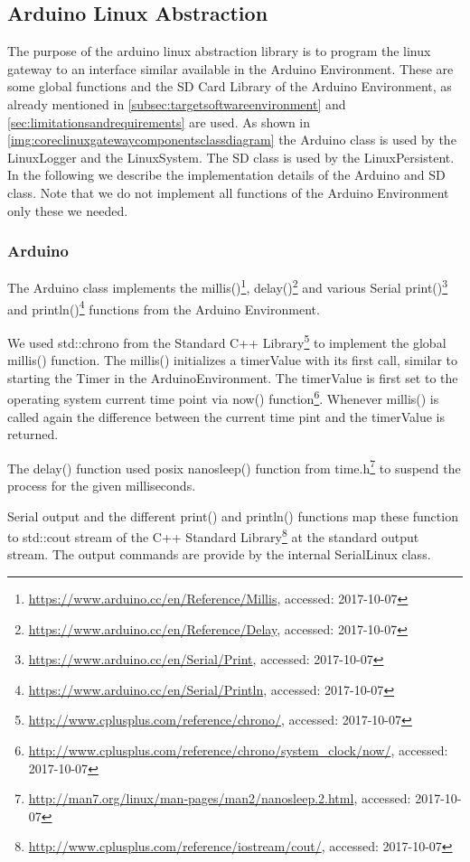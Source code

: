 \subsection{Arduino Linux Abstraction}\label{sec:arduinolinuxabstraction}
The purpose of the arduino linux abstraction library is to program the linux gateway to an interface similar available in the Arduino Environment.
These are some global functions and the SD Card Library of the Arduino Environment, as already mentioned in \autoref{subsec:targetsoftwareenvironment} and \autoref{sec:limitationsandrequirements} are used.
As shown in \autoref{img:coreclinuxgatewaycomponentsclassdiagram} the Arduino class is used by the LinuxLogger and the LinuxSystem.
The SD class is used by the LinuxPersistent.
In the following we describe the implementation details of the Arduino and SD class.
Note that we do not implement all functions of the Arduino Environment only these we needed.
\subsubsection{Arduino}
The Arduino class implements the millis()\footnote{\url{https://www.arduino.cc/en/Reference/Millis}, accessed: 2017-10-07}, delay()\footnote{\url{https://www.arduino.cc/en/Reference/Delay}, accessed: 2017-10-07} and various Serial print()\footnote{\url{https://www.arduino.cc/en/Serial/Print}, accessed: 2017-10-07} and println()\footnote{\url{https://www.arduino.cc/en/Serial/Println}, accessed: 2017-10-07} functions from the Arduino Environment.

We used std::chrono from the Standard C++ Library\footnote{\url{http://www.cplusplus.com/reference/chrono/}, accessed: 2017-10-07} to implement the global millis() function.
The millis() initializes a timerValue with its first call, similar to starting the Timer in the ArduinoEnvironment.
The timerValue is first set to the operating system current time point via now() function\footnote{\url{http://www.cplusplus.com/reference/chrono/system_clock/now/}, accessed: 2017-10-07}.
Whenever millis() is called again the difference between the current time pint and the timerValue is returned.

The delay() function used posix nanosleep() function from time.h\footnote{\url{http://man7.org/linux/man-pages/man2/nanosleep.2.html}, accessed: 2017-10-07} to suspend the process for the given milliseconds.

Serial output and the different print() and println() functions map these function to std::cout stream of the C++ Standard Library\footnote{\url{http://www.cplusplus.com/reference/iostream/cout/}, accessed: 2017-10-07} at the standard output stream.
The output commands are provide by the internal SerialLinux class.

